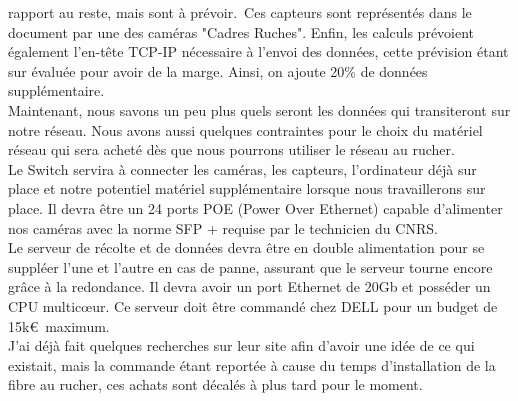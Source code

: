 \documentclass[11pt,french,a4paper]{report}
\begin{document}
rapport au reste, mais sont à prévoir. Ces capteurs sont représentés dans le document par une des caméras "Cadres Ruches". 
Enfin, les calculs prévoient également l'en-tête TCP-IP nécessaire à l'envoi des données, cette prévision étant sur évaluée 
pour avoir de la marge. Ainsi, on ajoute 20\% de données supplémentaire.\\
Maintenant, nous savons un peu plus quels seront les données qui transiteront sur notre réseau. Nous avons aussi
quelques contraintes pour le choix du matériel réseau qui sera acheté dès que nous pourrons utiliser le réseau au rucher. \\
Le Switch servira à connecter les caméras, les capteurs, l'ordinateur déjà sur place et notre potentiel matériel supplémentaire
lorsque nous travaillerons sur place. Il devra être un 24 ports POE (Power Over Ethernet) capable 
d'alimenter nos caméras avec la norme SFP + requise par le technicien du CNRS. \\
Le serveur de récolte et de données devra être en double alimentation pour se suppléer l'une et l'autre en cas de panne,
assurant que le serveur tourne encore grâce à la redondance. Il devra avoir un port Ethernet de 20Gb et posséder un CPU multicœur.
Ce serveur doit être commandé chez DELL pour un budget de 15k€ maximum. \\
J'ai déjà fait quelques recherches sur leur site afin d'avoir une idée de ce qui existait, mais la commande étant reportée à cause
du temps d'installation de la fibre au rucher, ces achats sont décalés à plus tard pour le moment.\\ 
\end{document}
